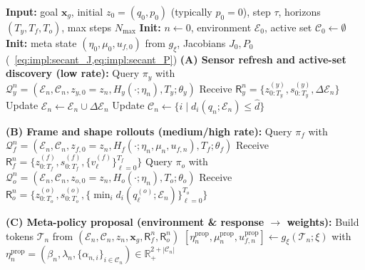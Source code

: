 \begin{algorithm}[htbp]
\caption{Online GRL--SNAM: Navigator-driven Hamiltonian composition with QoI feedback}
\label{algo:online_grl_snam}
\begin{algorithmic}[1]
\State \textbf{Input:} goal $\mathbf{x}_g$, initial $z_0=(q_0,p_0)$ (typically $p_0{=}0$), step $\tau$, horizons $(T_y,T_f,T_o)$, max steps $N_{\max}$
\State \textbf{Init:} $n\!\leftarrow\!0$, environment $\mathcal{E}_0$, active set $\mathcal{C}_0\!\leftarrow\!\emptyset$
\State \textbf{Init:} meta state $(\eta_0,\mu_0,u_{f,0})$ from $g_\xi$, Jacobians $J_0,P_0$ (~\cref{eq:impl:secant_J,eq:impl:secant_P})
 
    \State \textbf{(A) Sensor refresh and active-set discovery (low rate):}
        \State Query $\pi_y$ with $\mathcal{Q}_y^n=(\mathcal{E}_n,\mathcal{C}_n,z_{y,0}{=}z_n,H_y(\cdot;\eta_n),T_y;\theta_y)$
        \State Receive $\mathsf{R}_y^n=\{z_{0:T_y}^{(y)},s_{0:T_y}^{(y)},\Delta\mathcal{E}_n\}$
        \State Update $\mathcal{E}_n \leftarrow \mathcal{E}_n \cup \Delta\mathcal{E}_n$
        \State Update $\mathcal{C}_n \leftarrow \{i \mid d_i(q_n;\mathcal{E}_n)\le \hat d\}$ 
    \EndIf

    \State \textbf{(B) Frame and shape rollouts (medium/high rate):}
        \State Query $\pi_f$ with $\mathcal{Q}_f^n=(\mathcal{E}_n,\mathcal{C}_n,z_{f,0}{=}z_n,H_f(\cdot;\eta_n,\mu_n,u_{f,n}),T_f;\theta_f)$
        \State Receive $\mathsf{R}_f^n=\{z_{0:T_f}^{(f)},s_{0:T_f}^{(f)},\{v_\ell^{(f)}\}_{\ell=0}^{T_f}\}$
    \EndIf
    \State Query $\pi_o$ with $\mathcal{Q}_o^n=(\mathcal{E}_n,\mathcal{C}_n,z_{o,0}{=}z_n,H_o(\cdot;\eta_n),T_o;\theta_o)$
    \State Receive $\mathsf{R}_o^n=\{z_{0:T_o}^{(o)},s_{0:T_o}^{(o)},\{\min_i d_i(q_\ell^{(o)};\mathcal{E}_n)\}_{\ell=0}^{T_o}\}$

    \State \textbf{(C) Meta-policy proposal (environment \& response $\to$ weights):}
    \State Build tokens $\mathcal{T}_n$ from $(\mathcal{E}_n,\mathcal{C}_n,z_n,\mathbf{x}_g,\mathsf{R}_f^n,\mathsf{R}_o^n)$
    \State $[\eta_n^{\mathrm{prop}},\mu_n^{\mathrm{prop}},u_{f,n}^{\mathrm{prop}}] \leftarrow g_\xi(\mathcal{T}_n;\xi)$
    \State \hspace{1em}with $\eta_n^{\mathrm{prop}}=(\beta_n,\lambda_n,\{\alpha_{n,i}\}_{i\in\mathcal{C}_n}) \in \mathbb{R}_+^{2+|\mathcal{C}_n|}$


\end{algorithmic}
\end{algorithm}
